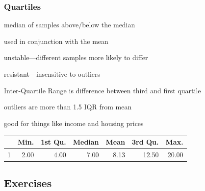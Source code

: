 \documentclass{exam}
\begin{document}
  \subsubsection{Quartiles}

  \begin{itemize*}
    \item median of samples above/below the median
    \item used in conjunction with the mean
    \item unstable---different samples more likely to differ
    \item resistant---insensitive to outliers
    \item Inter-Quartile Range is difference between third and first quartile
    \item outliers are more than 1.5 IQR from mean
    \item good for things like income and housing prices
  \end{itemize*}

  \begin{table}[ht]
    \centering
    \begin{tabular}{rrrrrrr}
      \toprule
        & Min. & 1st Qu. & Median & Mean & 3rd Qu. & Max. \\
      \midrule
      1 & 2.00 & 4.00    & 7.00   & 8.13 & 12.50   & 20.00 \\
      \bottomrule
    \end{tabular}
  \end{table}

  \subsection{Exercises}
\end{document}
